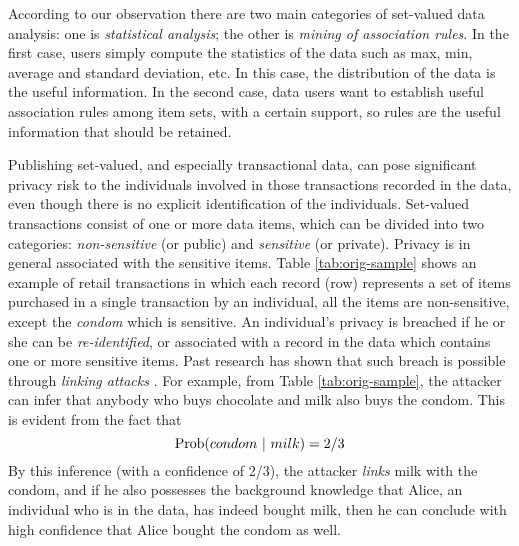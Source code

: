 According to our observation there are two main categories of set-valued
data analysis: one is {\em statistical analysis}; 
the other is {\em mining of association rules}. 
In the first case, users simply compute the statistics of the data such as max,
min, average and standard deviation, etc. In this case, the distribution of
the data is the useful information.
In the second case, data users want to establish useful
association rules among item sets, with a certain support,
so rules are the useful information that should be retained. 

Publishing set-valued, and especially transactional data,
can pose significant privacy risk to the
individuals involved in those transactions recorded in the data, even though
there is no explicit identification of the individuals.
Set-valued transactions consist of one or more data items, which can be divided into two categories:
{\em non-sensitive} (or public) and {\em sensitive} (or private).
Privacy is in general associated with the sensitive items.
Table \ref{tab:orig-sample} shows
an example of retail transactions in which each record (row) represents
a set of items purchased in a single transaction by an individual,
  all the items are non-sensitive, except the {\em condom}
which is sensitive. An individual's privacy is breached if he or she can be
{\em re-identified}, or associated with a record in the data which contains
one or more sensitive items. Past research has shown that such breach is
possible through {\em linking attacks} \cite{FungWCY10:Survey}. For example,
from Table \ref{tab:orig-sample}, the attacker can infer that anybody who buys
chocolate and milk also buys the condom.
This is evident from the fact that
\[{\rm Prob}(condom ~|~ milk) = 2/3\]
By this inference (with a confidence of 2/3), the attacker {\em links}
milk with the condom, and if he also possesses the
background knowledge that Alice, an individual who is in the data, has indeed
bought milk, then he can conclude with high confidence that
Alice bought the condom as well.


